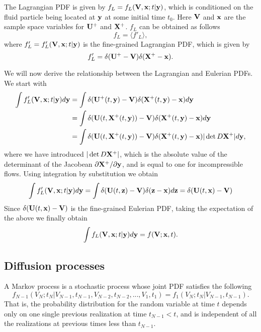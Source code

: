 \documentclass[oneside,a4paper,11pt]{report}
\begin{document}
The Lagrangian PDF is given by $f_L = f_L(\mathbf{V},\mathbf{x};t|\bold{y})$, which is conditioned on the fluid particle being located at $\mathbf{y}$ at some initial time $t_0$. Here $\mathbf{V}$ and $\mathbf{x}$ are the sample space variables for $\mathbf{U}^+$ and $\mathbf{X}^+$. $f_L$ can be obtained as follows 
\begin{equation}
f_L = \langle f'_L \rangle,
\end{equation}
where $f'_L = f'_L(\mathbf{V},\mathbf{x};t|\bold{y})$ is the fine-grained Lagrangian PDF, which is given by
\begin{equation}
f'_L = \delta(\bold{U}^+ - \mathbf{V}) \delta(\bold{X}^+ - \mathbf{x}).
\end{equation}

We will now derive the relationship between the Lagrangian and Eulerian PDFs. We start with
\begin{align}
\int f'_L(\mathbf{V},\mathbf{x};t|\mathbf{y}) d\mathbf{y} &= \int \delta(\bold{U}^+(t,\bold{y}) - \mathbf{V}) \delta(\bold{X}^+(t,\bold{y}) - \mathbf{x}) d\mathbf{y} \nonumber \\
&= \int \delta(\bold{U}(t,\bold{X}^+(t,\mathbf{y})) - \mathbf{V}) \delta(\bold{X}^+(t,\mathbf{y}) - \mathbf{x}) d\mathbf{y} \nonumber \\
&= \int \delta(\bold{U}(t,\bold{X}^+(t,\mathbf{y})) - \mathbf{V}) \delta(\bold{X}^+(t,\mathbf{y}) - \mathbf{x}) | \det D\bold{X^+} | d\mathbf{y},
\end{align}
where we have introduced $| \det D\bold{X^+} |$, which is the absolute value of the determinant of the Jacobean $\partial \bold{X}^+/\partial \mathbf{y}$, and is equal to one for incompressible flows. Using integration by substitution we obtain
\begin{equation}
\int f'_L(\mathbf{V},\mathbf{x};t|\mathbf{y}) d\mathbf{y} = \int \delta(\bold{U}(t,\mathbf{z}) - \mathbf{V}) \delta(\mathbf{z} - \mathbf{x}) d\mathbf{z} = \delta(\mathbf{U}(t,\mathbf{x}) - \mathbf{V})
\end{equation}
Since $\delta(\mathbf{U}(t,\mathbf{x}) - \mathbf{V})$ is the fine-grained Eulerian PDF, taking the expectation of the above we finally obtain
\begin{equation}
\label{eul_lag}
\int f_L(\mathbf{V},\mathbf{x};t|\mathbf{y}) d\mathbf{y} = f(\mathbf{V};\mathbf{x},t).
\end{equation}

\subsection{Diffusion processes}

A Markov process is a stochastic process whose joint PDF satisfies the following
\begin{equation}
f_{N-1}(V_N;t_N| V_{N-1}, t_{N-1}, V_{N-2}, t_{N-2}, ... , V_1, t_1) = f_1(V_N; t_N | V_{N-1}, t_{N-1}). 
\end{equation}
That is, the probability distribution for the random variable at time $t$ depends only on one single previous realization at time $t_{N-1} < t$, and is independent of all the realizations at previous times less than $t_{N-1}$.
\end{document}
